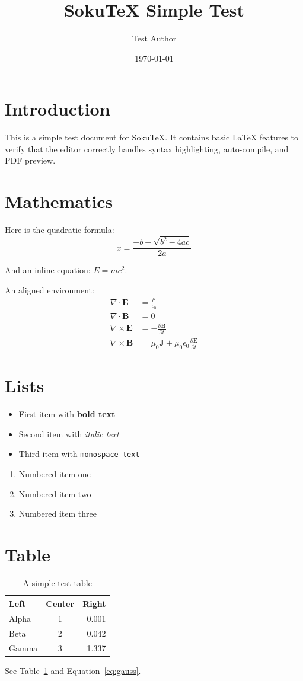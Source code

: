 \documentclass{article}
\title{SokuTeX Simple Test}
\author{Test Author}
\date{\today}
\begin{document}
\maketitle

\section{Introduction}
This is a simple test document for SokuTeX. It contains basic LaTeX features to verify
that the editor correctly handles syntax highlighting, auto-compile, and PDF preview.

\section{Mathematics}
Here is the quadratic formula:
\[
x = \frac{-b \pm \sqrt{b^2 - 4ac}}{2a}
\]

And an inline equation: $E = mc^2$.

An aligned environment:
\begin{align}
    \nabla \cdot \mathbf{E} &= \frac{\rho}{\epsilon_0} \label{eq:gauss} \\
    \nabla \cdot \mathbf{B} &= 0 \\
    \nabla \times \mathbf{E} &= -\frac{\partial \mathbf{B}}{\partial t} \\
    \nabla \times \mathbf{B} &= \mu_0 \mathbf{J} + \mu_0 \epsilon_0 \frac{\partial \mathbf{E}}{\partial t}
\end{align}

\section{Lists}
\begin{itemize}
    \item First item with \textbf{bold text}
    \item Second item with \textit{italic text}
    \item Third item with \texttt{monospace text}
\end{itemize}

\begin{enumerate}
    \item Numbered item one
    \item Numbered item two
    \item Numbered item three
\end{enumerate}

\section{Table}
\begin{table}[h]
\centering
\begin{tabular}{|l|c|r|}
\hline
\textbf{Left} & \textbf{Center} & \textbf{Right} \\
\hline
Alpha & 1 & 0.001 \\
Beta  & 2 & 0.042 \\
Gamma & 3 & 1.337 \\
\hline
\end{tabular}
\caption{A simple test table}
\label{tab:test}
\end{table}

See Table~\ref{tab:test} and Equation~\ref{eq:gauss}.
\end{document}
